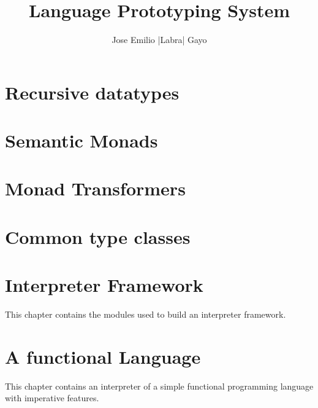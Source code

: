 \documentclass[9pt]{book}
\begin{document}
 
 \title{\bf Language Prototyping System
       }
 \author{Jose Emilio |Labra| Gayo}
 \maketitle

 \tableofcontents

 

 \chapter{Recursive datatypes}
 
 
 
 

 \chapter{Semantic Monads}
 
 
 
 
 
 
 
 
 \chapter{Monad Transformers}
 
 
 
 
 
 
 
 

 \chapter{Common type classes}
 
 
 
 

 
 \chapter{Interpreter Framework}
 This chapter contains the modules used to build an interpreter
 framework.

 
 
 
 

\chapter[A Functional Language]
	{A functional Language}
This chapter contains an interpreter of a simple functional 
programming language with imperative features.
\end{document}
